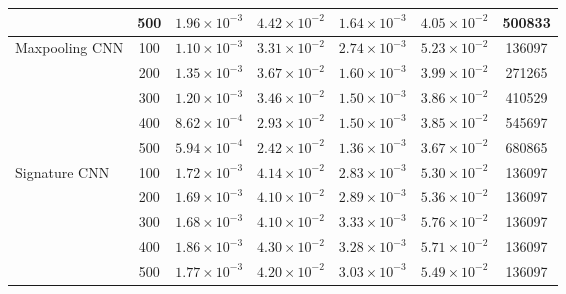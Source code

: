 \documentclass[]{article}
\renewcommand{\(}{\left(}
\renewcommand{\)}{\right)}
\begin{document}
\begin{table}[H]
{\begin{tabular}{l c c c c c c}
				&500&$1.96\times10^{-3}$&$4.42\times10^{-2}$&$1.64\times10^{-3}$&$4.05\times10^{-2}$&500833\\
				\hline
				\multirow{5}{*}{Maxpooling CNN}&100&$1.10\times10^{-3}$&$3.31\times10^{-2}$&$2.74\times10^{-3}$&$5.23\times10^{-2}$&136097\\
				&200&$1.35\times10^{-3}$&$3.67\times10^{-2}$&$1.60\times10^{-3}$&$3.99\times10^{-2}$&271265\\
				&300&$1.20\times10^{-3}$&$3.46\times10^{-2}$&$1.50\times10^{-3}$&$3.86\times10^{-2}$&410529\\
				&400&$8.62\times10^{-4}$&$2.93\times10^{-2}$&$1.50\times10^{-3}$&$3.85\times10^{-2}$&545697\\
				&500&$5.94\times10^{-4}$&$2.42\times10^{-2}$&$1.36\times10^{-3}$&$3.67\times10^{-2}$&680865\\
				\hline
				\multirow{5}{*}{Signature CNN}&100&$1.72\times10^{-3}$&$4.14\times10^{-2}$&$2.83\times10^{-3}$&$5.30\times10^{-2}$&136097\\
				&200&$1.69\times10^{-3}$&$4.10\times10^{-2}$&$2.89\times10^{-3}$&$5.36\times10^{-2}$&136097\\
				&300&$1.68\times10^{-3}$&$4.10\times10^{-2}$&$3.33\times10^{-3}$&$5.76\times10^{-2}$&136097\\
				&400&$1.86\times10^{-3}$&$4.30\times10^{-2}$&$3.28\times10^{-3}$&$5.71\times10^{-2}$&136097\\
				&500&$1.77\times10^{-3}$&$4.20\times10^{-2}$&$3.03\times10^{-3}$&$5.49\times10^{-2}$&136097\\
				\bottomrule
		\end{tabular}}
	\end{table}
\end{document}
